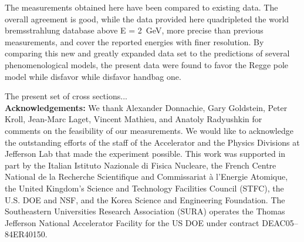 \documentclass[aps,prc,onecolumn,floatfix,showpacs,preprintnumbers,amsmath,amssymb,superscriptaddress]{revtex4-1}
\begin{document}
The measurements obtained here have been compared to
existing data. The overall agreement is good, while the 
data provided here quadripleted the world bremsstrahlung 
database above E = 2~GeV, more precise than previous 
measurements, and cover the reported energies with finer 
resolution.  By comparing this new and greatly expanded data 
set to the predictions of several phenomenological models, 
the present data were found to favor the Regge pole model 
while disfavor while disfavor handbag one.  

The present set of cross sections...\\

\textbf{Acknowledgements:}  We thank Alexander Donnachie, 
Gary Goldstein, Peter Kroll, Jean-Marc Laget, Vincent Mathieu, 
and Anatoly Radyushkin for comments on the feasibility of our 
measurements. We would like to acknowledge the outstanding 
efforts of the staff of the Accelerator and the Physics 
Divisions at Jefferson Lab that made the experiment possible.  
This work was supported in part by the Italian Istituto 
Nazionale di Fisica Nucleare, the French Centre National de 
la Recherche Scientifique and Commissariat \`a l'Energie 
Atomique, the United Kingdom's Science and Technology 
Facilities Council (STFC), the U.S. DOE and NSF, and the 
Korea Science and Engineering Foundation. The Southeastern 
Universities Research Association (SURA) operates the Thomas 
Jefferson National Accelerator Facility for the US DOE under 
contract DEAC05--84ER40150.
\end{document}
